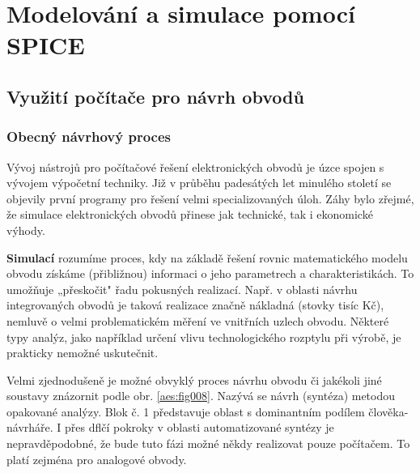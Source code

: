 \setchaptertoc
\chapter{Modelování a simulace pomocí SPICE}

  \section{Využití počítače pro návrh obvodů}
    \subsection{Obecný návrhový proces}
      Vývoj nástrojů pro počítačové řešení elektronických obvodů je úzce spojen s vývojem výpočetní
      techniky. Již v průběhu padesátých let minulého století se objevily první programy pro řešení
      velmi specializovaných úloh. Záhy bylo zřejmé, že simulace elektronických obvodů přinese jak
      technické, tak i ekonomické výhody. 
      
      \textbf{Simulací} rozumíme proces, kdy na základě řešení rovnic matematického modelu obvodu
      získáme (přibližnou) informaci o jeho parametrech a charakteristikách. To umožňuje „přeskočit"
      řadu pokusných realizací. Např. v oblasti návrhu integrovaných obvodů je taková realizace
      značně nákladná (stovky tisíc Kč), nemluvě o velmi problematickém měření ve vnitřních uzlech
      obvodu. Některé typy analýz, jako například určení vlivu technologického rozptylu při výrobě,
      je prakticky nemožné uskutečnit. 

      
      Velmi zjednodušeně je možné obvyklý proces návrhu obvodu či jakékoli jiné soustavy znázornit
      podle obr. \ref{aes:fig008}. Nazývá se návrh (syntéza) metodou opakované analýzy. Blok č. 1
      představuje oblast s dominantním podílem člověka-návrháře. I přes dflčí pokroky v oblasti
      automatizované syntézy je nepravděpodobné, že bude tuto fázi možné někdy realizovat pouze
      počítačem. To platí zejména pro analogové obvody.

